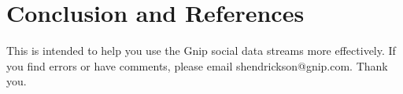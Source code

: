 \documentclass{article}
\begin{document}
\section{Conclusion and References}

This is intended to help you use the Gnip social data streams more effectively.  If you find errors or have comments, please email shendrickson@gnip.com. Thank you.

%
\end{document}
